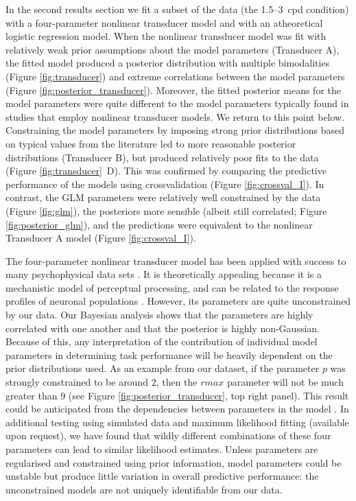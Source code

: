 \documentclass[11pt,a4paper]{article}
\begin{document}
{In the second results section we fit a subset of the data (the 1.5--3~cpd condition) with a four-parameter nonlinear transducer model and with an atheoretical logistic regression model.
When the nonlinear transducer model was fit with relatively weak prior assumptions about the model parameters (Transducer A), the fitted model produced a posterior distribution with multiple bimodalities (Figure \ref{fig:transducer}) and extreme correlations between the model parameters (Figure \ref{fig:posterior_transducer}).
Moreover, the fitted posterior means for the model parameters were quite different to the model parameters typically found in studies that employ nonlinear transducer models.
We return to this point below.
Constraining the model parameters by imposing strong prior distributions based on typical values from the literature led to more reasonable posterior distributions (Transducer B), but produced relatively poor fits to the data (Figure \ref{fig:transducer}~D).
This was confirmed by comparing the predictive performance of the models using crossvalidation (Figure \ref{fig:crossval_I}).
In contrast, the GLM parameters were relatively well constrained by the data (Figure \ref{fig:glm}), the posteriors more sensible (albeit still correlated; Figure \ref{fig:posterior_glm}), and the predictions were equivalent to the nonlinear Transducer A model (Figure \ref{fig:crossval_I}).

The four-parameter nonlinear transducer model has been applied with success to many psychophysical data sets \citep[e.g.][]{Foley1994, Tolhurst1997, Bex2007, Haun2010, Haun2013a, Holmes2004, Kwon2008, Meese2002, Meese2006}.
It is theoretically appealing because it is a mechanistic model of perceptual processing, and can be related to the response profiles of neuronal populations \citep{Kwon2008,Goris2013}.
However, its parameters are quite unconstrained by our data.
Our Bayesian analysis shows that the parameters are highly correlated with one another and that the posterior is highly non-Gaussian.
Because of this, any interpretation of the contribution of individual model parameters in determining task performance will be heavily dependent on the prior distributions used.
As an example from our dataset, if the parameter $p$ was strongly constrained to be around $2$, then the $rmax$ parameter will not be much greater than $9$ (see Figure \ref{fig:posterior_transducer}, top right panel).
This result could be anticipated from the dependencies between parameters in the model \citep{Yu2003,Haun2009}.
In additional testing using simulated data and maximum likelihood fitting (available upon request), we have found that wildly different combinations of these four parameters can lead to similar likelihood estimates.
Unless parameters are regularised and constrained using prior information, model parameters could be unstable but produce little variation in overall predictive performance: the unconstrained models are not uniquely identifiable from our data.

}
\end{document}
